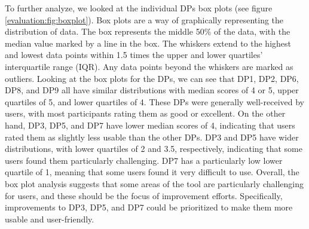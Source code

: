 To further analyze, we looked at the individual DPs box plots (see figure \ref{evaluation:fig:boxplot}). 
Box plots are a way of graphically representing the distribution of data. 
The box represents the middle 50\% of the data, with the median value marked by a line in the box. 
The whiskers extend to the highest and lowest data points within 1.5 times the upper and lower quartiles' interquartile range (IQR). 
Any data points beyond the whiskers are marked as outliers.
Looking at the box plots for the DPs, we can see that DP1, DP2, DP6, DP8, and DP9 all have similar distributions with median scores of 4 or 5, upper quartiles of 5, and lower quartiles of 4. 
These DPs were generally well-received by users, with most participants rating them as good or excellent.
On the other hand, DP3, DP5, and DP7 have lower median scores of 4, indicating that users rated them as slightly less usable than the other DPs. 
DP3 and DP5 have wider distributions, with lower quartiles of 2 and 3.5, respectively, indicating that some users found them particularly challenging. 
DP7 has a particularly low lower quartile of 1, meaning that some users found it very difficult to use.
Overall, the box plot analysis suggests that some areas of the tool are particularly challenging for users, and these should be the focus of improvement efforts. 
Specifically, improvements to DP3, DP5, and DP7 could be prioritized to make them more usable and user-friendly.

